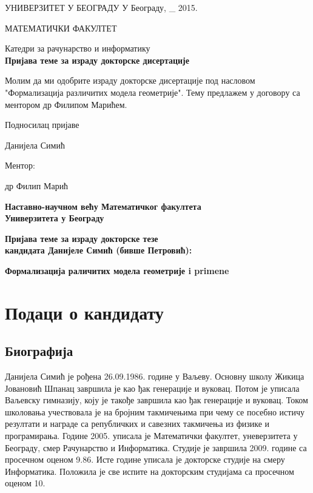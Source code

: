 \documentclass{article}
\begin{document}
       УНИВЕРЗИТЕТ У БЕОГРАДУ  \hfill{У Београду, \_ 2015.} 
       
       МАТЕМАТИЧКИ ФАКУЛТЕТ
 

\begin{center}
 {\small Катедри за рачунарство и информатику } \\
 
 {\bf Пријава теме за израду докторске дисертације}
\end{center}

  Молим да ми одобрите израду докторске дисертације под насловом "Формализација
  различитих модела геометрије". Тему предлажем у договору 
  са ментором др Филипом Марићем. 
  
  \vspace{1cm}
  
  \hfill{Подносилац пријаве} 
  
  \vspace{0.5cm}
  
  \hfill{\underline{\hspace{ 3in}}} 
  
  \hfill{Данијела Симић} 
  
  \vspace{1cm}
  
  \hfill{Ментор:} 
  
  \hfill{др Филип Марић}

  
  \newpage
  
\begin{center}
{\bf Наставно-научном већу Математичког факултета\\
Универзитета у Београду}

\vspace{1cm}

{\bf Пријава теме за израду докторске тезе \\
     кандидата Данијеле Симић (бивше Петровић):}

\vspace{0.5cm}     

{\bf Формализација раличитих модела геометрије i primene}
\end{center}

\section{Подаци о кандидату}
\subsection{Биографија}
   Данијела Симић је рођена 26.09.1986. године у Ваљеву. Основну школу 
   Жикица Јовановић Шпанац завршила је као ђак генерације и вуковац. 
   Потом је уписала Ваљевску гимназију, коју је такође завршила као ђак 
   генерације и вуковац. Током школовања учествовала је на бројним такмичењима
   при чему се посебно истичу резултати и награде са републичких и савезних 
   такмичења из физике и програмирања. Године 2005. уписала је Математички
   факултет, уневерзитета у Београду, смер Рачунарство и Информатика. 
   Студије је завршила 2009. године са просечном оценом 9.86. Исте године
   уписала је докторске студије на смеру Информатика. Положила је све испите 
   на докторским студијама са просечном оценом 10.
   
\end{document}
